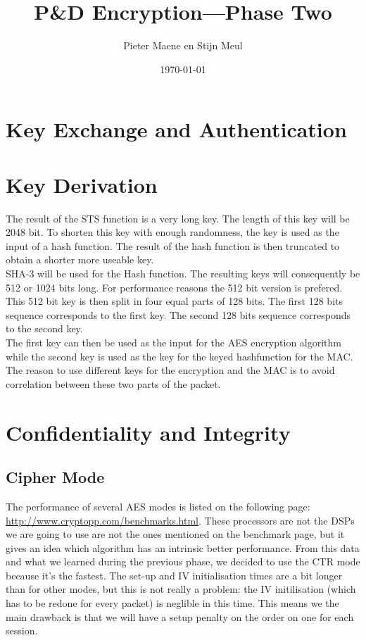 \documentclass[a4paper]{article}
\title{P\&D Encryption---Phase Two}
\author{Pieter Maene en Stijn Meul}
\date{\today}
\begin{document}
\maketitle

\section{Key Exchange and Authentication}

\section{Key Derivation}

The result of the STS function is a very long key. The length of this key will be 2048 bit. To shorten this key with enough randomness, the key is used as the input of a hash function. The result of the hash function is then truncated to obtain a shorter more useable key.\\

SHA-3 will be used for the Hash function. The resulting keys will consequently be 512 or 1024 bits long. For performance reasons the 512 bit version is prefered. This 512 bit key is then split in four equal parts of 128 bits. The first 128 bits sequence corresponds to the first key. The second 128 bits sequence corresponds to the second key.\\

The first key can then be used as the input for the AES encryption algorithm while the second key is used as the key for the keyed hashfunction for the MAC. The reason to use different keys for the encryption and the MAC is to avoid correlation between these two parts of the packet.

\section{Confidentiality and Integrity}

\subsection{Cipher Mode}

The performance of several AES modes is listed on the following page: \url{http://www.cryptopp.com/benchmarks.html}. These processors are not the DSPs we are going to use are not the ones mentioned on the benchmark page, but it gives an idea which algorithm has an intrinsic better performance. From this data and what we learned during the previous phase, we decided to use the CTR mode because it's the fastest. The set-up and IV initialisation times are a bit longer than for other modes, but this is not really a problem: the IV initilisation (which has to be redone for every packet) is neglible in this time. This means we the main drawback is that we will have a setup penalty on the order on one {\micro\second} for each session.\\
\end{document}
